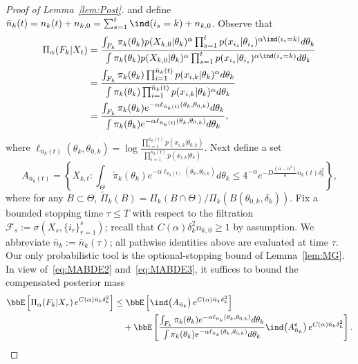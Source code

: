 \documentclass[11pt]{article}
\begin{document}
\begin{proof}[Proof of Lemma~\ref{lem:Post}]
 and define $\bar n_k(t)=n_k(t)+n_{k,0} =\sum_{s=1}^{t}  \ind(i_s = k) + n_{k,0} $. Observe that 
\begin{align}
    \nonumber
    \Pi_{\alpha}(F_k|X_{t})&= \frac{\int_{F_k} \pi_k(\theta_k) p(X_{k,0}|\theta_{k})^{\alpha}\prod_{s=1}^{t} p(x_{i_s}|\theta_{i_s})^{\alpha \ind(i_s = k)} d\theta_k} {\int \pi_k(\theta_k) p(X_{k,0}|\theta_{k})^{\alpha}\prod_{s=1}^{t} p(x_{i_s} |\theta_{i_s})^{\alpha \ind(i_s = k)} d\theta_k }
        \\
        \nonumber
        &= \frac{\int_{F_k} \pi_k(\theta_k) \prod_{i=1}^{\bar n_k(t)} p(x_{i,k}|\theta_k)^{\alpha }d\theta_k} {\int \pi_k(\theta_k) \prod_{i=1}^{\bar n_k(t)} p(x_{i,k}|\theta_k)^{\alpha }d\theta_k }
        \\
        &= \frac{\int_{F_k} \pi_k(\theta_k) e^{-\alpha \ell_{\bar n_k(t)}(\theta_k,\theta_{0,k})}d\theta_k} {\int \pi_k(\theta_k) e^{-\alpha \ell_{\bar n_k(t)}(\theta_k,\theta_{0,k})}d\theta_k },
        \label{eq:MABDE3}
\end{align}
where $\ell_{\bar n_k(t)}(\theta_k,\theta_{0,k})= \log \frac{\prod_{i=1}^{\bar n_k(t)} p(x_{i,k}|\theta_{0,k})}{\prod_{i=1}^{\bar n_k(t)} p(x_{i,k}|\theta_k)}$.
Next define a set 
\[A_{\bar n_k(t)} = \left\{ X_{k,t}: \int_{\Theta} \tilde \pi_k(\theta_k) e^{-\alpha \ell_{\bar n_k(t)}(\theta_k,\theta_{0,k})}d\theta_k \leq 4^{-\alpha} e^{-D \frac{(\alpha-\alpha^2)}{8} \bar n_k(t)\delta_k^2}  \right\},\] where for any $B\subset \Theta$, $\tilde \Pi_k(B) = \Pi_k\left(B\cap \Theta\right)/\Pi_k\left(B\left(\theta_{0,k},\delta_k \right)\right)$.
Fix a bounded stopping time $\tau \leq T$ with respect to the filtration $\mathcal{F}_s := \sigma\left(X_s, \{i_r\}_{r=1}^s\right)$; recall that $C(\alpha)\delta_k^2 n_{k,0} \geq 1$ by assumption. We abbreviate $\bar n_k := \bar n_k(\tau)$; all pathwise identities above are evaluated at time $\tau$. Our only probabilistic tool is the optional-stopping bound of Lemma~\ref{lem:MG}. %
In view of~\eqref{eq:MABDE2} and~\eqref{eq:MABDE3}, it suffices to bound the compensated posterior mass
\begin{align}
     \bbE\left[\Pi_{\alpha}(F_k|X_{\tau})\, e^{C(\alpha) \bar n_k \delta_k^2}\right] &\leq \bbE\left[\ind\big(A_{\bar n_k}\big)\, e^{C(\alpha) \bar n_k \delta_k^2}\right] \nonumber
     \\
     &\quad + \bbE \left[  \frac{\int_{F_k} \pi_k(\theta_k) e^{-\alpha \ell_{\bar n_k}(\theta_k,\theta_{0,k})}d\theta_k} {\int \pi_k(\theta_k) e^{-\alpha \ell_{\bar n_k}(\theta_k,\theta_{0,k})}d\theta_k } \ind\big(A_{\bar n_k}^\mathtt{c}\big)\, e^{C(\alpha) \bar n_k \delta_k^2} \right].
    \label{eq:MABDE4}
\end{align}


\end{proof}
\end{document}
